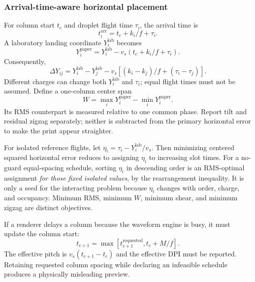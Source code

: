 \subsubsection{Arrival-time-aware horizontal placement}
For column start $t_c$ and droplet flight time $\tau_i$, the arrival time is
\begin{equation}
 t_i^{\mathrm{arr}}=t_c+k_i/f+\tau_i.
\end{equation}
A laboratory landing coordinate $Y_i^{\mathrm{lab}}$ becomes
\begin{equation}
 Y_i^{\mathrm{paper}}=Y_i^{\mathrm{lab}}-v_s(t_c+k_i/f+\tau_i).
\label{eq:paper}
\end{equation}
Consequently,
\begin{equation}
 \Delta Y_{ij}=Y_i^{\mathrm{lab}}-Y_j^{\mathrm{lab}}
 -v_s\left[(k_i-k_j)/f+(\tau_i-\tau_j)\right].
\end{equation}
Different charges can change both $Y_i^{\mathrm{lab}}$ and $\tau_i$; equal flight times must not be assumed. Define a one-column center span
\begin{equation}
 W=\max_iY_i^{\mathrm{paper}}-\min_iY_i^{\mathrm{paper}}.
\end{equation}
Its RMS counterpart is measured relative to one common phase. Report tilt and residual zigzag separately; neither is subtracted from the primary horizontal error to make the print appear straighter.

For isolated reference flights, let $\eta_i=\tau_i-Y_i^{\mathrm{lab}}/v_s$. Then minimizing centered squared horizontal error reduces to assigning $\eta_i$ to increasing slot times. For a no-guard equal-spacing schedule, sorting $\eta_i$ in descending order is an RMS-optimal assignment \emph{for those fixed isolated values}, by the rearrangement inequality. It is only a seed for the interacting problem because $\eta_i$ changes with order, charge, and occupancy. Minimum RMS, minimum $W$, minimum shear, and minimum zigzag are distinct objectives.

If a renderer delays a column because the waveform engine is busy, it must update the column start:
\begin{equation}
 t_{c+1}=\max\left[t_{c+1}^{\mathrm{requested}},t_c+M/f\right].
\end{equation}
The effective pitch is $v_s(t_{c+1}-t_c)$ and the effective DPI must be reported. Retaining requested column spacing while declaring an infeasible schedule produces a physically misleading preview.


